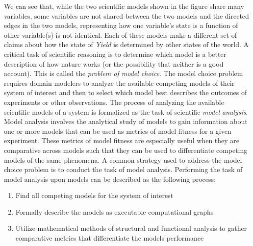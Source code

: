 We can see that, while the two scientific models shown in the figure share many variables, some variables are not shared between the two models and the directed edges in the two models, representing how one variable’s state is a function of other variable(s) is not identical.
Each of these models make a different set of claims about how the state of \emph{Yield} is determined by other states of the world.
A critical task of scientific reasoning is to determine which model is a better description of how nature works (or the possibility that neither is a good account).
This is called the \emph{problem of model choice}. 
The model choice problem requires domain modelers to analyze the available competing models of their system of interest and then to select which model best describes the outcomes of experiments or other observations.
The process of analyzing the available scientific models of a system is formalized as the task of scientific \emph{model analysis}.
Model analysis involves the analytical study of models to gain information about one or more models that can be used as metrics of model fitness for a given experiment.
These metrics of model fitness are especially useful when they are comparative across models such that they can be used to differentiate competing models of the same phenomena.
A common strategy used to address the model choice problem is to conduct the task of model analysis.
Performing the task of model analysis upon models can be described as the following process:
\begin{enumerate}
  \item Find all competing models for the system of interest
  \item Formally describe the models as executable computational graphs
  \item Utilize mathematical methods of structural and functional analysis to gather comparative metrics that differentiate the models performance
\end{enumerate}

